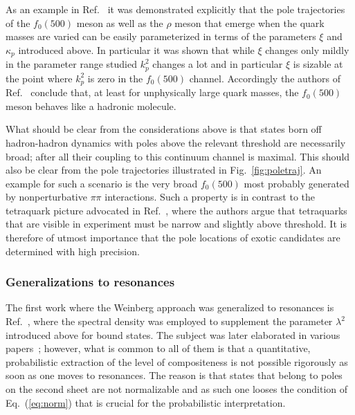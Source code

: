 As an example in Ref.~\cite{Hanhart:2014ssa} it was demonstrated explicitly that
the pole trajectories of the $f_0(500)$ meson as well as the $\rho$
meson that emerge when the quark masses are varied can be easily parameterized
in terms of the parameters $\xi$ and $\kappa_p$ introduced above.
In particular it was shown that while $\xi$ changes only mildly in the parameter
range studied $k_p^2$ changes a lot and in particular $\xi$ is sizable at the
point where $k_p^2$ is zero in the $f_0(500)$ channel. Accordingly the authors
of Ref.~\cite{Hanhart:2014ssa} conclude that, at least for unphysically large
quark masses, the $f_0(500)$ meson behaves like a hadronic molecule.

What should be clear from the considerations above is that states born off
hadron-hadron dynamics with poles above the relevant threshold are necessarily
broad; after all their coupling to this continuum channel is maximal.
This should also be clear from the pole trajectories illustrated in
Fig.~\ref{fig:poletraj}. An example for such a scenario is the very broad
$f_0(500)$ most probably generated by nonperturbative $\pi\pi$ interactions.
Such a property is in contrast to the tetraquark picture advocated in
Ref.~\cite{Esposito:2016itg}, where the authors argue that tetraquarks that are
visible in experiment must be narrow and slightly above threshold. It is
therefore of utmost importance that the pole locations of exotic candidates are
determined with high precision.


\subsubsection{Generalizations to resonances}
\label{sec:resonances}


The first work where the Weinberg approach was generalized to resonances is
Ref.~\cite{Baru:2003qq}, where the spectral density was employed to supplement
the parameter $\lambda^2$ introduced above for bound states.
The subject was later elaborated in various
papers~\cite{Hyodo:2011qc,Aceti:2012dd,Hyodo:2013iga,Hyodo:2013nka,
Sekihara:2014kya,Sekihara:2016xnq,
Guo:2015daa,Xiao:2016dsx,Xiao:2016wbs,Kang:2016ezb,Xiao:2016mon}; however, what
is common to all of them is that a quantitative, probabilistic extraction of the level of compositeness is not possible rigorously as soon as one moves to
resonances. The reason is that states that belong to poles on the second sheet
are not normalizable and as such one looses the condition of Eq.~(\ref{eq:norm})
that is crucial for the probabilistic interpretation.

